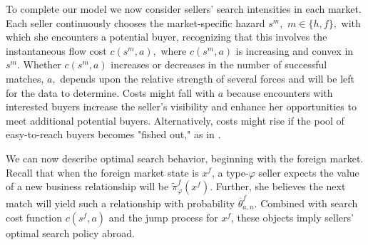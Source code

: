 To complete our model we now consider sellers' search intensities in each
market. Each seller continuously chooses the market-specific hazard $s^{m},$ 
$m\in \{h,f\},$ with which she encounters a potential buyer, recognizing
that this involves the instantaneous flow cost $c(s^{m},a),$ where $%
c(s^{m},a)$ is increasing and convex in $s^{m}.$\footnotemark{} Whether $c(s^{m},a)$ increases or decreases in the number of
successful matches, $a,$ depends upon the relative strength of several
forces and will be left for the data to determine. Costs might fall with $a$
because encounters with interested buyers increase the seller's visibility
and enhance her opportunities to meet additional potential buyers.
Alternatively, costs might rise if the pool of easy-to-reach buyers becomes
"fished out," as in \citet{arkolakis2010market}.

We can now describe optimal search behavior, beginning with the foreign
market. Recall that when the foreign market state is $x^{f}$, a type-$%
\varphi $ seller expects the value of a new business relationship will be $%
\widetilde{\pi }_{\varphi }^{f}(x^{f}).$ Further, she believes the next
match will yield such a relationship with probability $\overline{\theta }%
_{a,n}^{f}$. Combined with search cost function $c(s^{f},a)$ and the jump
process for $x^{f}$, these objects imply sellers' optimal search policy
abroad.

